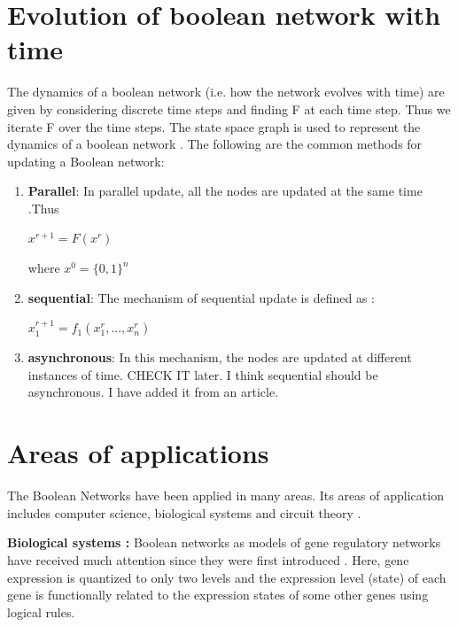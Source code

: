 \documentclass[11pt]{report}
\begin{document}
    \section{\color{red} Evolution of boolean network with time}
    The dynamics of a boolean network (i.e. how the network evolves with time) are given by considering discrete time steps and finding F at each time step.
    Thus we iterate F over the time steps. The state space graph is used to represent the dynamics of a boolean network \cite{Veliz-Cuba2011}.
    The following are the common methods for updating a Boolean network:
    \begin{enumerate}
     \item \textbf{Parallel}: In parallel update, all the nodes are updated at the same time \cite{Goles2010}.Thus
     \begin{center} $x^{r+1}=F(x^{r})$\end{center}
     where $x^{0}=\{0,1\}^{n}$
     \item \textbf{sequential}: The mechanism of sequential update is defined as \cite{Goles2010}:
     \begin{center}
      $x_{1}^{r+1}=f_{1}(x_{1}^{r},...,x_{n}^{r})$
     \end{center} 
     \begin{center}
     \end{center}
     \item \textbf{asynchronous}: In this mechanism, the nodes are updated at different instances of time.
     {\color{red}CHECK IT later. I think sequential should be asynchronous. I have added it from an article.}
    \end{enumerate}

    \section{Areas of applications}
    The Boolean Networks have been applied in many areas.
    Its areas of application includes computer science, biological systems and circuit theory \cite{Goles2010}.
    
    \textbf{Biological systems : } Boolean networks as models of gene regulatory networks have received much attention since they were first introduced \cite{Shmulevich2002}.
    Here, gene expression is quantized to only two levels and the expression level (state) of each gene is functionally related to the expression states of some other genes using logical rules.
    
\end{document}
